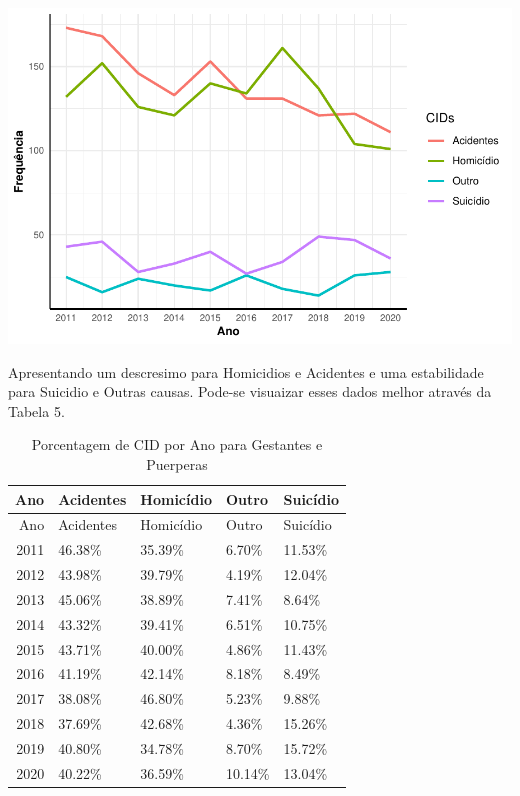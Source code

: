 \documentclass[
]{article}
\let\origfigure\figure
\let\endorigfigure\endfigure
\renewenvironment{figure}[1][2] {
    \expandafter\origfigure\expandafter[H]
} {
    \endorigfigure
}
\begin{document}
\begin{figure}
\centering
\includegraphics{RelatorioV02_files/figure-latex/unnamed-chunk-6-1.pdf}
\caption{Frequência de Obitos por CID para Gestantes e Puérperas}
\end{figure}

Apresentando um descresimo para Homicidios e Acidentes e uma
estabilidade para Suicidio e Outras causas. Pode-se visuaizar esses
dados melhor através da Tabela 5.

\begin{longtable}[]{@{}rllll@{}}
\caption{Porcentagem de CID por Ano para Gestantes e
Puerperas}\tabularnewline
\toprule()
Ano & Acidentes & Homicídio & Outro & Suicídio \\
\midrule()
\endfirsthead
\toprule()
Ano & Acidentes & Homicídio & Outro & Suicídio \\
\midrule()
\endhead
2011 & 46.38\% & 35.39\% & 6.70\% & 11.53\% \\
2012 & 43.98\% & 39.79\% & 4.19\% & 12.04\% \\
2013 & 45.06\% & 38.89\% & 7.41\% & 8.64\% \\
2014 & 43.32\% & 39.41\% & 6.51\% & 10.75\% \\
2015 & 43.71\% & 40.00\% & 4.86\% & 11.43\% \\
2016 & 41.19\% & 42.14\% & 8.18\% & 8.49\% \\
2017 & 38.08\% & 46.80\% & 5.23\% & 9.88\% \\
2018 & 37.69\% & 42.68\% & 4.36\% & 15.26\% \\
2019 & 40.80\% & 34.78\% & 8.70\% & 15.72\% \\
2020 & 40.22\% & 36.59\% & 10.14\% & 13.04\% \\
\bottomrule()
\end{longtable}
\end{document}
